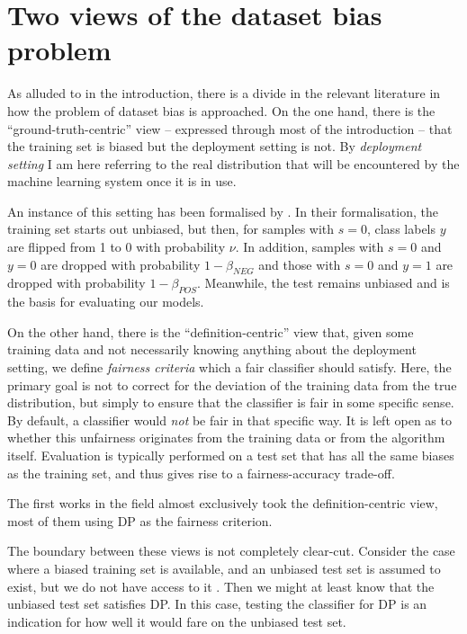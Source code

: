 \section{Two views of the dataset bias problem}\label{two-views-of-the-dataset-bias-problem}
As alluded to in the introduction,
there is a divide in the relevant literature in how the problem of dataset bias is approached.
On the one hand, there is the ``ground-truth-centric'' view -- expressed through most of the introduction --
that the training set is biased but the deployment setting is not.
By \emph{deployment setting} I am here referring to the real distribution
that will be encountered by the machine learning system once it is in use.


An instance of this setting has been formalised by \citet{blum2020recovering}.
In their formalisation, the training set starts out unbiased,
but then, for samples with \(s=0\), class labels \(y\) are flipped from 1 to 0 with probability \(\nu\).
In addition, samples with \(s=0\) and \(y=0\) are dropped with probability \(1-\beta_\mathit{NEG}\)
and those with \(s=0\) and \(y=1\) are dropped with probability \(1-\beta_\mathit{POS}\).
Meanwhile, the test remains unbiased and is the basis for evaluating our models.

On the other hand, there is the ``definition-centric'' view that,
given some training data and not necessarily knowing anything about the deployment setting,
we define \emph{fairness criteria} which a fair classifier should satisfy.
Here, the primary goal is not to correct for the deviation of the training data from the true distribution,
but simply to ensure that the classifier is fair in some specific sense.
By default, a classifier would \emph{not} be fair in that specific way.
It is left open as to whether this unfairness originates from the training data or from the algorithm itself.
Evaluation is typically performed on a test set that has all the same biases as the training set,
and thus gives rise to a fairness-accuracy trade-off.

The first works in the field almost exclusively took the definition-centric view,
most of them using \acf{DP} \citep{dwork2012fairness} as the fairness criterion.

The boundary between these views is not completely clear-cut.
Consider the case where a biased training set is available,
and an unbiased test set is assumed to exist, but we do not have access to it \citep{jiang2020identifying}.
Then we might at least know that the unbiased test set satisfies \ac{DP}.
In this case, testing the classifier for \ac{DP} is an indication
for how well it would fare on the unbiased test set.

